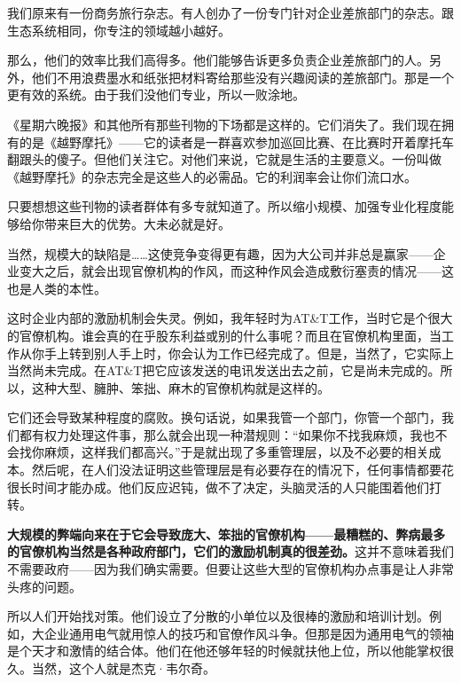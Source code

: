 我们原来有一份商务旅行杂志。有人创办了一份专门针对企业差旅部门的杂志。跟生态系统相同，你专注的领域越小越好。
\par

那么，他们的效率比我们高得多。他们能够告诉更多负责企业差旅部门的人。另外，他们不用浪费墨水和纸张把材料寄给那些没有兴趣阅读的差旅部门。那是一个更有效的系统。由于我们没他们专业，所以一败涂地。
\par

《星期六晚报》和其他所有那些刊物的下场都是这样的。它们消失了。我们现在拥有的是《越野摩托》——它的读者是一群喜欢参加巡回比赛、在比赛时开着摩托车翻跟头的傻子。但他们关注它。对他们来说，它就是生活的主要意义。一份叫做《越野摩托》的杂志完全是这些人的必需品。它的利润率会让你们流口水。
\par

只要想想这些刊物的读者群体有多专就知道了。所以缩小规模、加强专业化程度能够给你带来巨大的优势。大未必就是好。
\par

当然，规模大的缺陷是……这使竞争变得更有趣，因为大公司并非总是赢家——企业变大之后，就会出现官僚机构的作风，而这种作风会造成敷衍塞责的情况——这也是人类的本性。
\par

这时企业内部的激励机制会失灵。例如，我年轻时为AT\&T工作，当时它是个很大的官僚机构。谁会真的在乎股东利益或别的什么事呢？而且在官僚机构里面，当工作从你手上转到别人手上时，你会认为工作已经完成了。但是，当然了，它实际上当然尚未完成。在AT\&T把它应该发送的电讯发送出去之前，它是尚未完成的。所以，这种大型、臃肿、笨拙、麻木的官僚机构就是这样的。
\par

它们还会导致某种程度的腐败。换句话说，如果我管一个部门，你管一个部门，我们都有权力处理这件事，那么就会出现一种潜规则：“如果你不找我麻烦，我也不会找你麻烦，这样我们都高兴。”于是就出现了多重管理层，以及不必要的相关成本。然后呢，在人们没法证明这些管理层是有必要存在的情况下，任何事情都要花很长时间才能办成。他们反应迟钝，做不了决定，头脑灵活的人只能围着他们打转。
\par

\textbf{大规模的弊端向来在于它会导致庞大、笨拙的官僚机构——最糟糕的、弊病最多的官僚机构当然是各种政府部门，它们的激励机制真的很差劲。}这并不意味着我们不需要政府——因为我们确实需要。但要让这些大型的官僚机构办点事是让人非常头疼的问题。
\par

所以人们开始找对策。他们设立了分散的小单位以及很棒的激励和培训计划。例如，大企业通用电气就用惊人的技巧和官僚作风斗争。但那是因为通用电气的领袖是个天才和激情的结合体。他们在他还够年轻的时候就扶他上位，所以他能掌权很久。当然，这个人就是杰克·韦尔奇。
\par

